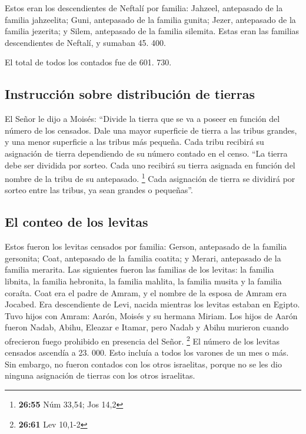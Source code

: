  Estos eran los descendientes de Neftalí por familia:
Jahzeel, antepasado de la familia jahzeelita; Guni, antepasado de la
familia gunita;  Jezer, antepasado de la familia
jezerita; y Silem, antepasado de la familia silemita. 
Estas eran las familias descendientes de Neftalí, y sumaban 45. 400.

 El total de todos los contados fue de 601. 730.

\hypertarget{instrucciuxf3n-sobre-distribuciuxf3n-de-tierras}{%
\subsection{Instrucción sobre distribución de
tierras}\label{instrucciuxf3n-sobre-distribuciuxf3n-de-tierras}}

 El Señor le dijo a Moisés:  ``Divide la
tierra que se va a poseer en función del número de los censados.
 Dale una mayor superficie de tierra a las tribus
grandes, y una menor superficie a las tribus más pequeña. Cada tribu
recibirá su asignación de tierra dependiendo de su número contado en el
censo.  ``La tierra debe ser dividida por sorteo. Cada
uno recibirá su tierra asignada en función del nombre de la tribu de su
antepasado. \footnote{\textbf{26:55} Núm 33,54; Jos 14,2}
 Cada asignación de tierra se dividirá por sorteo entre
las tribus, ya sean grandes o pequeñas''.

\hypertarget{el-conteo-de-los-levitas}{%
\subsection{El conteo de los levitas}\label{el-conteo-de-los-levitas}}

 Estos fueron los levitas censados por familia: Gerson,
antepasado de la familia gersonita; Coat, antepasado de la familia
coatita; y Merari, antepasado de la familia merarita. 
Las siguientes fueron las familias de los levitas: la familia libnita,
la familia hebronita, la familia mahlita, la familia musita y la familia
coraíta. Coat era el padre de Amram,  y el nombre de la
esposa de Amram era Jocabed. Era descendiente de Levi, nacida mientras
los levitas estaban en Egipto. Tuvo hijos con Amram: Aarón, Moisés y su
hermana Miriam.  Los hijos de Aarón fueron Nadab, Abihu,
Eleazar e Itamar,  pero Nadab y Abihu murieron cuando
ofrecieron fuego prohibido en presencia del Señor. \footnote{\textbf{26:61}
  Lev 10,1-2}  El número de los levitas censados ascendía
a 23. 000. Esto incluía a todos los varones de un mes o más. Sin
embargo, no fueron contados con los otros israelitas, porque no se les
dio ninguna asignación de tierras con los otros israelitas.

